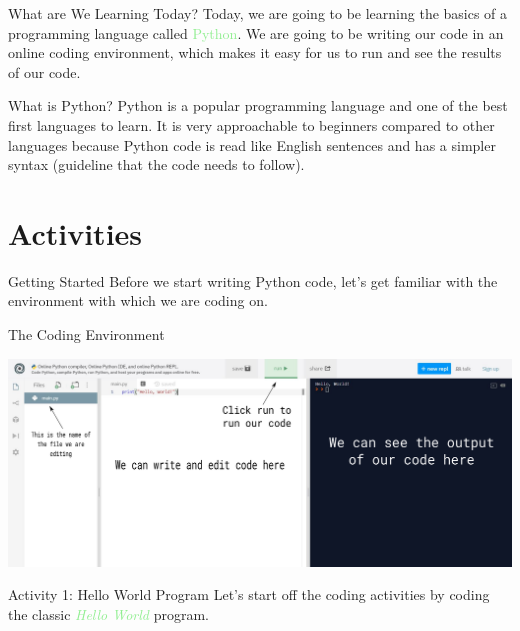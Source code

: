 \documentclass[hyperref={pdfpagemode=FullScreen},aspectratio=169]{beamer}
\begin{document}
  \begin{frame}{What are We Learning Today?}
    Today, we are going to be learning the basics of a programming language called \textcolor{lightGreen}{Python}. We are going to be writing our code in an online coding environment, which makes it easy for us to run and see the results of our code.
  \end{frame}
  
  \begin{frame}{What is Python?}
  Python is a popular programming language and one of the best first languages to learn. It is very approachable to beginners compared to other languages because Python code is read like English sentences and has a simpler syntax (guideline that the code needs to follow).
  
  \end{frame}
  
  \section{\Huge{Activities}}
  
  \begin{frame}{Getting Started} 
    Before we start writing Python code, let's get familiar with the environment with which we are coding on. 
  \end{frame}
  
  \begin{frame}{The Coding Environment}
  \begin{center}
    \includegraphics[scale=0.35]{imgs/codeEditor.pdf}
  \end{center}
  \end{frame}
  
  \begin{frame}{Activity 1: Hello World Program}
    Let's start off the coding activities by coding the classic \textit{\textcolor{lightGreen}{Hello World}} program. 
  \end{frame}
\end{document}
